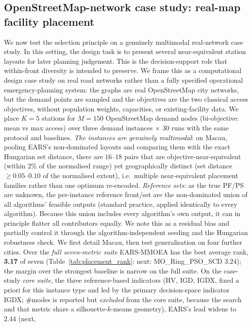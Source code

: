 \subsection{OpenStreetMap-network case study: real-map facility placement}
\label{sec:placement}
We now test the selection principle on a genuinely multimodal real-network case study. In this
setting, the design task is to present several near-equivalent station layouts for later planning
judgement. This is the decision-support role that within-front diversity is intended to preserve.
We frame this as a computational design case study on real road networks rather than a fully
specified operational emergency-planning system: the graphs are real OpenStreetMap city networks,
but the demand points are sampled and the objectives are the two classical access objectives,
without population weights, capacities, or existing-facility data. We place $K=5$ stations for
$M=150$ OpenStreetMap demand nodes
(bi-objective: mean vs max access) over three demand instances $\times$ 30 runs with the same
protocol and baselines. \emph{The instances are genuinely multimodal}: on Macau, pooling EARS's
non-dominated layouts and comparing them with the exact Hungarian set distance, there are
$16$--$18$ pairs that are objective-near-equivalent (within $2\%$ of the normalised range) yet
geographically distinct (set distance $\ge 0.05$--$0.10$ of the normalised extent), i.e.\ multiple
near-equivalent placement families rather than one optimum re-encoded. \emph{Reference sets:} as
the true PF/PS are unknown, the per-instance reference front/set are the non-dominated union of all
algorithms' feasible outputs (standard practice, applied identically to every algorithm). Because
this union includes every algorithm's own output, it can in principle flatter all contributors
equally. We note this as a residual bias and partially control it through the
algorithm-independent seeding and the Hungarian robustness check. We first detail Macau, then test generalisation on four
further cities. Over the \emph{full seven-metric suite} EARS-MMOEA has the best
average rank, \textbf{3.17} of seven (Table~\ref{tab:placement_rank}; next:
MO\_Ring\_PSO\_SCD $3.24$); the margin over the strongest baseline is narrow on the full
suite. On the case-study \emph{core suite}, the three reference-based indicators (HV, IGD, IGDX,
fixed a priori for this instance type and led by the primary decision-space indicator IGDX;
$\#$modes is reported but \emph{excluded} from the core suite, because the search and that metric
share a silhouette-$k$-means geometry), EARS's lead widens to $2.44$ (next,

